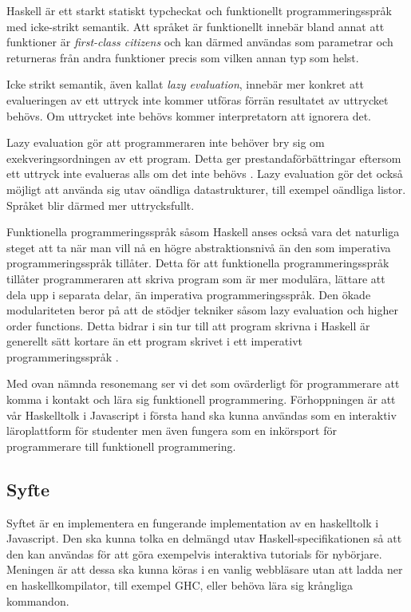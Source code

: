 Haskell är ett starkt statiskt typcheckat och funktionellt programmeringsspråk med icke-strikt semantik. 
Att språket är funktionellt innebär bland annat att funktioner är \emph{first-class citizens} och kan därmed användas som parametrar och returneras från andra funktioner precis som vilken annan typ som helst.

Icke strikt semantik, även kallat \emph{lazy evaluation}, innebär mer konkret att evalueringen av ett uttryck inte kommer utföras förrän resultatet av uttrycket behövs. Om uttrycket inte behövs  kommer interpretatorn att ignorera det. 

Lazy evaluation gör att programmeraren inte behöver bry sig om exekveringsordningen av ett program. Detta ger prestandaförbättringar eftersom ett uttryck inte evalueras alls om det inte behövs \citep{hudak89}.
Lazy evaluation gör det också möjligt att använda sig utav oändliga datastrukturer, till exempel oändliga listor. Språket blir därmed mer uttrycksfullt. 

Funktionella programmeringsspråk såsom Haskell anses också vara det naturliga steget att ta när man vill nå en högre abstraktionsnivå än den som imperativa programmeringsspråk tillåter.
Detta för att funktionella programmeringsspråk tillåter programmeraren att skriva program som är mer modulära, lättare att dela upp i separata delar, än imperativa programmeringsspråk. Den ökade modulariteten beror på att de stödjer tekniker såsom lazy evaluation och higher order functions.
Detta bidrar i sin tur till att program skrivna i Haskell är generellt sätt kortare än ett program skrivet i ett imperativt programmeringsspråk  \citep{why}.

Med ovan nämnda resonemang ser vi det som ovärderligt för programmerare att komma i kontakt och lära sig funktionell programmering. 
Förhoppningen är att vår Haskelltolk i Javascript i första hand ska kunna användas som en interaktiv läroplattform för studenter men även fungera som en inkörsport för programmerare till funktionell programmering. 


\subsection{Syfte}
Syftet är en implementera en fungerande implementation av en haskelltolk i Javascript. Den ska kunna tolka en delmängd utav Haskell-specifikationen så att den kan användas för att göra exempelvis interaktiva tutorials för nybörjare.
Meningen är att dessa ska kunna köras i en vanlig webbläsare utan att ladda ner en haskellkompilator, till exempel GHC, eller behöva lära sig krångliga kommandon.

